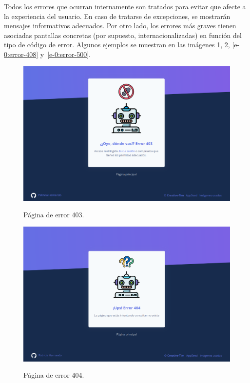 Todos los errores que ocurran internamente son tratados para evitar que afecte a la experiencia del usuario. En caso de tratarse de excepciones, se mostrarán mensajes informativos adecuados. Por otro lado, los errores más graves tienen asociadas pantallas concretas (por supuesto, internacionalizadas) en función del tipo de código de error. Algunos ejemplos se muestran en las imágenes \ref{e-0:error-403}, \ref{e-0:error-404}, \ref{e-0:error-408} y~\ref{e-0:error-500}.

\begin{figure}[h]
	\caption[Manual de usuario: error 403]{Página de error 403.}
	\centering
	\includegraphics[width=\textwidth]{../img/anexos/user_guide/0_error_403}
	\label{e-0:error-403}
\end{figure}

\begin{figure}[h]
	\caption[Manual de usuario: error 404]{Página de error 404.}
	\centering
	\includegraphics[width=\textwidth]{../img/anexos/user_guide/0_error_404}
	\label{e-0:error-404}
\end{figure}

